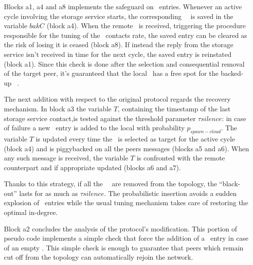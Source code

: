 Blocks a1, a4 and a8 implements the safeguard on
\cloud\ entries. Whenever an active cycle involving the storage
service starts, the corresponding \cloud\ \descriptor\ is saved in the
variable $bakC$ (block a4). When the remote \view\ is received,
triggering the procedure responsible for the tuning of the
\cloud\ contacts rate, the saved entry can be cleared as the risk of
losing it is ceased (block a8). If instead the reply from the storage
service isn't received in time for the next cycle, the saved entry is
reinstated (block a1). Since this check is done after the selection and
consequential removal of the target peer, it's guaranteed that the local
\view\ has a free spot for the backed-up \cloud\ \descriptor.

The next addition with respect to the original protocol regards the
recovery mechanism. In block a3 the variable $T$, containing the
timestamp of the last storage service contact,is tested against the
threshold parameter $\tau silence$: in case of failure a new
\cloud\ entry is added to the local \view with probability
$p_{spawn-cloud}$. The variable $T$ is updated every time the
\cloud\ is selected as target for the active cycle (block a4) and is
piggybacked on all the peers messages (blocks a5 and a6). When any
such message is received, the variable $T$ is confronted with the
remote counterpart and if appropriate updated (blocks a6 and a7).

Thanks to this strategy, if all the \cloud\ \descriptor\ are removed
from the topology, the ``black-out'' lasts for as much as $\tau
silence$. The probabilistic insertion avoids a sudden explosion of
\cloud\ entries while the usual tuning mechanism takes care of
restoring the optimal in-degree.

Block a2 concludes the analysis of the protocol's modification. This
portion of pseudo code implements a simple check that force the
addition of a \cloud\ entry in case of an empty \view. This simple
check is enough to guarantee that peers which remain cut off from the
topology can automatically rejoin the network.
